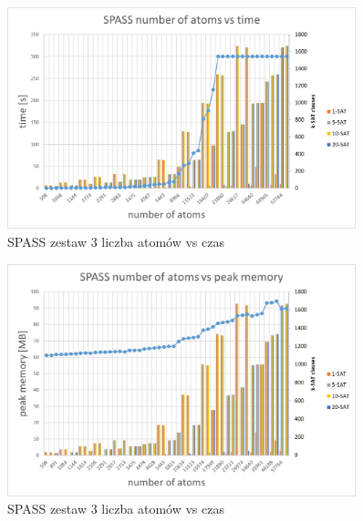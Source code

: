 \documentclass[a4paper,12pt]{article}
\begin{document}
\begin{figure}[H]
  \centerline{\includegraphics[width=0.9\textwidth]{outputs/set3/set3 charts/13 SPASS number of atoms vs time.jpg}}
  \caption{SPASS zestaw 3 liczba atomów vs czas}
\end{figure}

\begin{figure}[H]
  \centerline{\includegraphics[width=0.9\textwidth]{outputs/set3/set3 charts/14 SPASS number of atoms vs peak memory.jpg}}
  \caption{SPASS zestaw 3 liczba atomów vs czas}
\end{figure}

\printglossary
\end{document}
